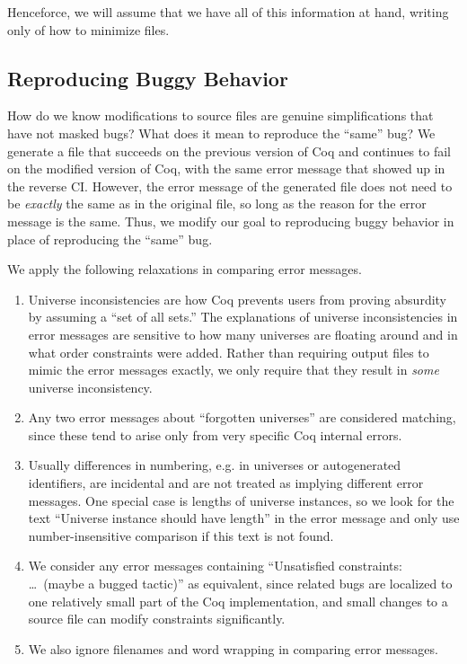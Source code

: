 \documentclass[a4paper,USenglish,cleveref,autoref,thm-restate]{lipics-v2021}
\begin{document}
Henceforce, we will assume that we have all of this information at hand, writing only of how to minimize files.

\subsection{Reproducing Buggy Behavior}\label{sec:error-messages}

How do we know modifications to source files are genuine simplifications that have not masked bugs?
What does it mean to reproduce the ``same'' bug?
We generate a file that succeeds on the previous version of Coq and continues to fail on the modified version of Coq, with the same error message that showed up in the reverse CI.
However, the error message of the generated file does not need to be \emph{exactly} the same as in the original file, so long as the reason for the error message is the same. 
Thus, we modify our goal to reproducing buggy behavior in place of reproducing the ``same'' bug. 

We apply the following relaxations in comparing error messages.
\begin{enumerate}

\item Universe inconsistencies are how Coq prevents users from proving absurdity by assuming a ``set of all sets.''
The explanations of universe inconsistencies in error messages are sensitive to how many universes are floating around and in what order constraints were added.
Rather than requiring output files to mimic the error messages exactly, we only require that they result in \emph{some} universe inconsistency.

\item Any two error messages about ``forgotten universes'' are considered matching, since these tend to arise only from very specific Coq internal errors.

\item Usually differences in numbering, e.g. in universes or autogenerated identifiers, are incidental and are not treated as implying different error messages.  One special case is lengths of universe instances, so we look for the text ``Universe instance should have length'' in the error message and only use number-insensitive comparison if this text is not found.

\item We consider any error messages containing ``Unsatisfied constraints: \ldots\ (maybe a bugged tactic)'' as equivalent, since related bugs are localized to one relatively small part of the Coq implementation, and small changes to a source file can modify constraints significantly.

\item We also ignore filenames and word wrapping in comparing error messages.

\end{enumerate}
\end{document}

